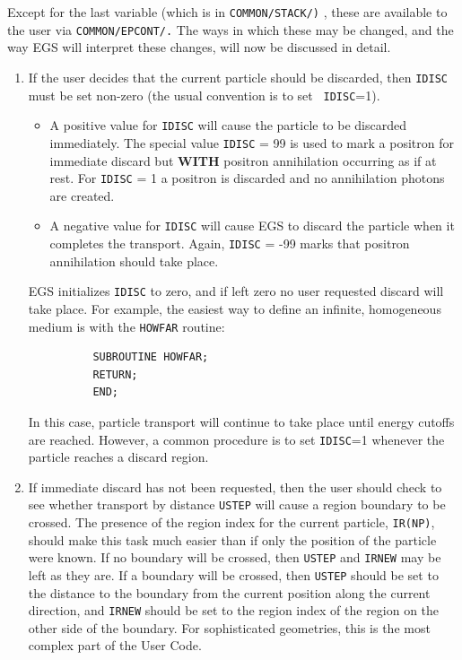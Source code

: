 Except for the last variable (which is in {\tt COMMON/STACK/)} , these are
available to the user via {\tt COMMON/EPCONT/.}  The ways in which these
may be changed, and the way EGS will interpret these changes, will now be
discussed in detail.
\begin{enumerate}
\item  If the user decides that the current particle should be discarded,
then {\tt IDISC} must be set non-zero (the usual convention is to set {\tt
IDISC}=1).
\begin{itemize}
\item A positive value for {\tt IDISC} will cause the particle to be discarded
immediately.  The special value {\tt IDISC} = 99 is used to mark a positron for
immediate discard but {\bfseries WITH} positron annihilation occurring as
if at rest. For {\tt IDISC} = 1 a positron is discarded and no annihilation
photons are created.
\item A negative value for {\tt IDISC} will cause EGS to discard the particle
when it completes the transport. Again, {\tt IDISC} = -99 marks that positron
annihilation should take place.
\end{itemize}
EGS initializes {\tt IDISC} to zero, and if left zero no user requested discard
will take place.  For example, the easiest way to define an infinite,
homogeneous medium is with the {\tt HOWFAR} routine:
\begin{verbatim}
          SUBROUTINE HOWFAR;
          RETURN;
          END;
\end{verbatim}
In this case, particle transport will continue to take place until energy
cutoffs are reached. However, a common procedure is to set {\tt IDISC}=1 whenever
the particle reaches a discard region.


\item If immediate discard has not been requested, then the user should
check to see whether transport by distance {\tt USTEP} will cause a region
boundary to be crossed.  The presence of the region index for the current
particle, {\tt IR(NP)}, should make this task much easier than if only the
position of the particle were known.  If no boundary will be crossed, then
{\tt USTEP} and {\tt IRNEW} may be left as they are.  If a boundary will be crossed,
then {\tt USTEP} should be set to the distance to the boundary from the current
position along the current direction, and {\tt IRNEW} should be set to the region
index of the region on the other side of the boundary.  For sophisticated
geometries, this is the most complex part of the User Code.



\end{enumerate}
